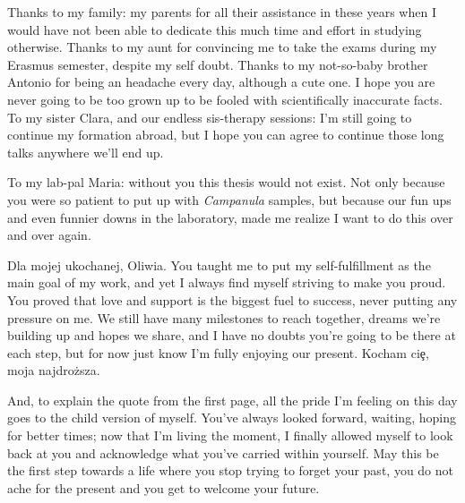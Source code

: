 \documentclass[a4paper, 12pt]{report}
\begin{document}
Thanks to my family: my parents for all their assistance in these years when I would have not been able to dedicate this much time and effort in studying otherwise. Thanks to my aunt for convincing me to take the exams during my Erasmus semester, despite my self doubt. Thanks to my not-so-baby brother Antonio for being an headache every day, although a cute one. I hope you are never going to be too grown up to be fooled with scientifically inaccurate facts. To my sister Clara, and our endless sis-therapy sessions: I'm still going to continue my formation abroad, but I hope you can agree to continue those long talks anywhere we'll end up.

To my lab-pal Maria: without you this thesis would not exist. Not only because you were so patient to put up with \textit{Campanula} samples, but because our fun ups and even funnier downs in the laboratory, made me realize I want to do this over and over again.

Dla mojej ukochanej, Oliwia. You taught me to put my self-fulfillment as the main goal of my work, and yet I always find myself striving to make you proud. You proved that love and support is the biggest fuel to success, never putting any pressure on me. We still have many milestones to reach together, dreams we're building up and hopes we share, and I have no doubts you're going to be there at each step, but for now just know I'm fully enjoying our present. Kocham ci\c{e}, moja najdro\.{z}sza.

And, to explain the quote from the first page, all the pride I'm feeling on this day goes to the child version of myself. You've always looked forward, waiting, hoping for better times; now that I'm living the moment, I finally allowed myself to look back at you and acknowledge what you've carried within yourself. May this be the first step towards a life where you stop trying to forget your past, you do not ache for the present and you get to welcome your future.
\thispagestyle{empty}
\clearpage
\end{document}
